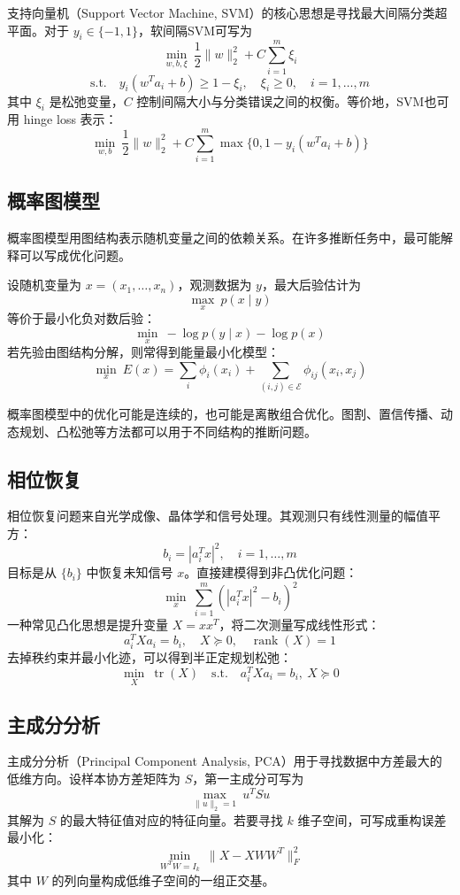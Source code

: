 支持向量机（Support Vector Machine, SVM）的核心思想是寻找最大间隔分类超平面。对于 $y_i\in\{-1,1\}$，软间隔SVM可写为
\[
\min_{w,b,\xi}\ \frac{1}{2}\|w\|_2^2 + C\sum_{i=1}^{m}\xi_i
\]
\[
\text{s.t.}\quad y_i(w^T a_i+b)\geq 1-\xi_i,\quad \xi_i\geq0,\quad i=1,\ldots,m
\]
其中 $\xi_i$ 是松弛变量，$C$ 控制间隔大小与分类错误之间的权衡。等价地，SVM也可用 hinge loss 表示：
\[
\min_{w,b}\ \frac{1}{2}\|w\|_2^2+C\sum_{i=1}^{m}\max\{0,1-y_i(w^Ta_i+b)\}
\]

\subsection{概率图模型}

概率图模型用图结构表示随机变量之间的依赖关系。在许多推断任务中，最可能解释可以写成优化问题。

\begin{conceptbox}[MAP推断的优化形式]
设随机变量为 $x=(x_1,\ldots,x_n)$，观测数据为 $y$，最大后验估计为
\[
\max_x\ p(x\mid y)
\]
等价于最小化负对数后验：
\[
\min_x\ -\log p(y\mid x)-\log p(x)
\]
若先验由图结构分解，则常得到能量最小化模型：
\[
\min_x\ E(x)=\sum_i \phi_i(x_i)+\sum_{(i,j)\in \mathcal{E}}\phi_{ij}(x_i,x_j)
\]
\end{conceptbox}

概率图模型中的优化可能是连续的，也可能是离散组合优化。图割、置信传播、动态规划、凸松弛等方法都可以用于不同结构的推断问题。

\subsection{相位恢复}

相位恢复问题来自光学成像、晶体学和信号处理。其观测只有线性测量的幅值平方：
\[
b_i = |a_i^T x|^2,\quad i=1,\ldots,m
\]
目标是从 $\{b_i\}$ 中恢复未知信号 $x$。直接建模得到非凸优化问题：
\[
\min_x\ \sum_{i=1}^{m}\left(|a_i^T x|^2-b_i\right)^2
\]
一种常见凸化思想是提升变量 $X=xx^T$，将二次测量写成线性形式：
\[
a_i^T X a_i = b_i,\quad X\succeq0,\quad \operatorname{rank}(X)=1
\]
去掉秩约束并最小化迹，可以得到半正定规划松弛：
\[
\min_X\ \operatorname{tr}(X)\quad
\text{s.t.}\quad a_i^T X a_i=b_i,\ X\succeq0
\]

\subsection{主成分分析}

主成分分析（Principal Component Analysis, PCA）用于寻找数据中方差最大的低维方向。设样本协方差矩阵为 $S$，第一主成分可写为
\[
\max_{\|u\|_2=1}\ u^T S u
\]
其解为 $S$ 的最大特征值对应的特征向量。若要寻找 $k$ 维子空间，可写成重构误差最小化：
\[
\min_{W^TW=I_k}\ \|X-XWW^T\|_F^2
\]
其中 $W$ 的列向量构成低维子空间的一组正交基。

